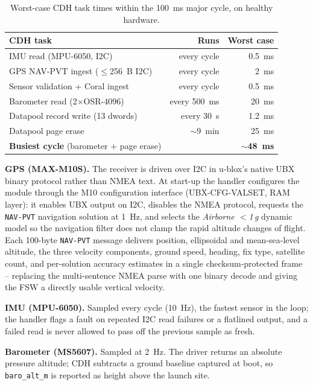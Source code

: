 \begin{table}[H]
\centering
\begin{tabular}{lrr}
\toprule
\textbf{CDH task} & \textbf{Runs} & \textbf{Worst case} \\
\midrule
IMU read (MPU-6050, I2C)              & every cycle   & 0.5~ms \\
GPS NAV-PVT ingest ($\le$256~B I2C)  & every cycle   & 2~ms \\
Sensor validation + Coral ingest     & every cycle   & 0.5~ms \\
Barometer read (2$\times$OSR-4096)   & every 500~ms  & 20~ms \\
Datapool record write (13 dwords)    & every 30~s    & 1.2~ms \\
Datapool page erase                  & $\sim$9~min   & 25~ms \\
\midrule
\textbf{Busiest cycle} (barometer + page erase) & & \textbf{$\sim$48~ms} \\
\bottomrule
\end{tabular}
\caption{Worst-case CDH task times within the 100~ms major cycle, on healthy
hardware.}
\label{tab:cdh-timing}
\end{table}

\textbf{GPS (MAX-M10S).} The receiver is driven over I2C in u-blox's native
UBX binary protocol rather than NMEA text. At start-up the handler
configures the module through the M10 configuration interface
(UBX-CFG-VALSET, RAM layer): it enables UBX output on I2C, disables the
NMEA protocol, requests the \texttt{NAV-PVT} navigation solution at 1~Hz,
and selects the \emph{Airborne $<$1\,g} dynamic model so the navigation
filter does not clamp the rapid altitude changes of flight. Each 100-byte
\texttt{NAV-PVT} message delivers position, ellipsoidal and mean-sea-level
altitude, the three velocity components, ground speed, heading, fix type,
satellite count, and per-solution accuracy estimates in a single
checksum-protected frame -- replacing the multi-sentence NMEA parse with
one binary decode and giving the FSW a directly usable vertical velocity.

\textbf{IMU (MPU-6050).} Sampled every cycle (10~Hz), the fastest sensor in
the loop; the handler flags a fault on repeated I2C read failures or a
flatlined output, and a failed read is never allowed to pass off the
previous sample as fresh.

\textbf{Barometer (MS5607).} Sampled at 2~Hz. The driver returns an absolute
pressure altitude; CDH subtracts a ground baseline captured at boot, so
\texttt{baro\_alt\_m} is reported as height above the launch site.

